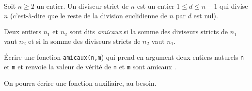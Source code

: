 \exer{}
\setcounter{numques}{0}

Soit $n \geq 2$ un entier. Un diviseur strict de $n$ est un entier $1 \leq d \leq n-1$ qui divise $n$ (c'est-à-dire que le reste de la division euclidienne de $n$ par $d$ est nul). 

Deux entiers $n_1$ et $n_2$ sont dits \emph{amicaux} si la somme des diviseurs stricts de $n_1$ vaut $n_2$ et si la somme des diviseurs stricts de $n_2$ vaut $n_1$. 

\bigskip{}

\question{} Écrire une fonction \texttt{amicaux(n,m}) qui prend en argument deux entiers naturels \texttt{n} et \texttt{m} et renvoie la valeur de vérité de \og \texttt{n} et \texttt{m} sont amicaux \fg{}.

On pourra écrire une fonction auxiliaire, au besoin. 